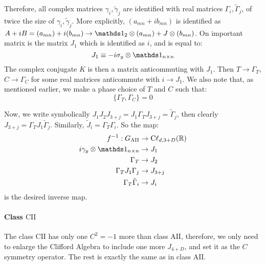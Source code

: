 Therefore, all complex matrices $\gamma_i,\tilde{\gamma}_j$ are identified with
real matrices $\Gamma_i,\tilde{\Gamma}_j$, of twice the size of
$\gamma_i,\tilde{\gamma}_j$. More explicitly, $(a_{mn}+i b_{mn})$ is identified
as $A+iB = (a_{mn})+i(b_{mn}) \to \id_2\otimes(a_{mn})+J\otimes(b_{mn})$. On
important matrix is the matrix $J_1$ which is identified as $i$, and is equal to:
\begin{equation}
    J_1 \equiv -i\sigma_y \otimes \id_{n\times n}
\end{equation}
The complex conjugate $K$ is then a matrix anticommuting with $J_1$.  Then $T\to
\Gamma_T$, $C\to \Gamma_C$ for some real matrices anticommute with $i\to J_1$.
We also note that, as mentioned earlier, we make a phase choice of $T$ and $C$
such that:
\begin{equation}
    \{\Gamma_T,\Gamma_C\} = 0
\end{equation}

Now, we write symbolically $J_1J_2J_{3+j} = J_1 \Gamma_T J_{3+j} =
\tilde{\Gamma}_j$, then clearly $J_{3+j} = \Gamma_T J_1\tilde{\Gamma}_j$.
Similarly, $\tilde{J}_i = \Gamma_T\Gamma_i$. So the map:
\begin{align}
    f^{-1}: G_{\mathrm{AII}} &\to \mathrm{C\ell}_{d,3+D}(\R) \\
    i\gamma_y \otimes \id_{n\times n} &\to J_1 \nonumber\\
    \Gamma_T &\to J_2 \nonumber\\
    \Gamma_TJ_1\Gamma_j &\to J_{3+j} \nonumber\\
    \Gamma_T\tilde{\Gamma}_i &\to J_{i} \nonumber
\end{align}
is the desired inverse map.

\paragraph{Class $\mathrm{CII}$} The class $\mathrm{CII}$ has only one $C^2=-1$
more than class $\mathrm{AII}$, therefore, we only need to enlarge the Clifford
Algebra to include one more $J_{4+D}$, and set it as the $C$ symmetry operator.
The rest is exactly the same as in class $\mathrm{AII}$.

